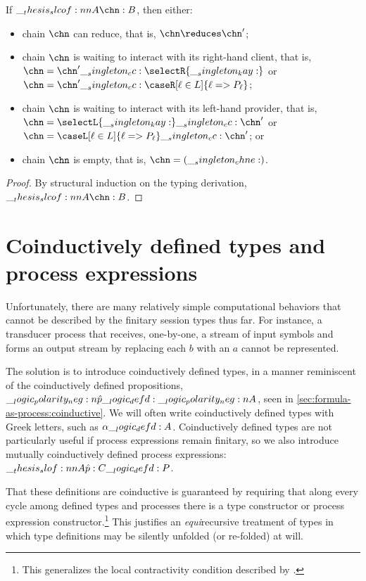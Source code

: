 \begin{theorem}[Progress]
  If $\slcof{A |- \chn : B}$, then either:
  \begin{itemize}[nosep]
  \item chain $\chn$ can reduce, that is, $\chn \reduces \chn'$;
  \item chain $\chn$ is waiting to interact with its right-hand client, that is, $\chn = \chn' \cc \selectR{\kay}$ or $\chn = \chn' \cc \caseR[\ell \in L]{\ell => P_{\ell}}$;
  \item chain $\chn$ is waiting to interact with its left-hand provider, that is, $\chn = \selectL{\kay} \cc \chn'$ or $\chn = \caseL[\ell \in L]{\ell => P_{\ell}} \cc \chn'$; or
  \item chain $\chn$ is empty, that is, $\chn = (\chne)$.
  \end{itemize}
\end{theorem}
\begin{proof}
  By structural induction on the typing derivation, $\slcof{A |- \chn : B}$.
\end{proof}

\clearpage
\section{Coinductively defined types and process expressions}\label{sec:process-chains:coinductive}

Unfortunately, there are many relatively simple computational behaviors that cannot be described by the finitary session types thus far.
For instance, a transducer process that receives, one-by-one, a stream of input symbols and forms an output stream by replacing each $b$ with an $a$ cannot be represented.

The solution is to introduce coinductively defined types, in a manner reminiscent of the coinductively defined propositions, $\__logic_polarity_neg:n {\hat{p}} \__logic_defd: \__logic_polarity_neg:n {A}$, seen in \cref{sec:formula-as-process:coinductive}.
We will often write coinductively defined types with Greek letters, such as $\alpha \__logic_defd: A$.
Coinductively defined types are not particularly useful if process expressions remain finitary, so we also introduce mutually coinductively defined process expressions: $\slof{A |- \defp{p} : C} \defd P$.

That these definitions are coinductive is guaranteed by requiring that along every cycle among defined types and processes there is a type constructor or process expression constructor.\footnote{This generalizes the local contractivity condition described by \textcite{Gay+Hole:AI05}.}
This justifies an \emph{equi}\-recursive treatment of types in which type definitions may be silently unfolded (or re-folded) at will.

